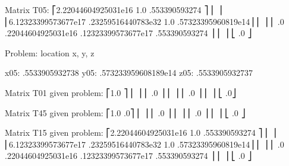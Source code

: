 \documentclass[letterpaper,10pt,english,openany,oneside]{sphinxmanual}
\begin{document}
\begin{sphinxVerbatim}[commandchars=\\\{\},numbers=left,firstnumber=1,stepnumber=1]
  Matrix T05:
  ⎡2.22044604925031e\PYGZhy{}16          \PYGZhy{}1.0                                 .553390593274  ⎤
  ⎢                                                                                      ⎥
  ⎢6.12323399573677e\PYGZhy{}17  .23259516440783e\PYGZhy{}32          \PYGZhy{}1.0          .57323395960819e\PYGZhy{}14⎥
  ⎢                                                                                      ⎥
  ⎢        .0           .22044604925031e\PYGZhy{}16  .12323399573677e\PYGZhy{}17    .553390593274  ⎥
  ⎢                                                                                      ⎥
  ⎣                                                                       .0         ⎦


  Problem: location x, y, z

  x05: .5533905932738
  y05: .573233959608189e\PYGZhy{}14
  z05: .5533905932737

  Matrix T01  given problem:
  ⎡1.0            ⎤
  ⎢                  ⎥
  ⎢    .0        ⎥
  ⎢                  ⎥
  ⎢        .0    ⎥
  ⎢                  ⎥
  ⎣            .0⎦

  Matrix T45  given problem:
  ⎡1.0          .0⎤
  ⎢                    ⎥
  ⎢    .0          ⎥
  ⎢                    ⎥
  ⎢        .0      ⎥
  ⎢                    ⎥
  ⎣             .0 ⎦

  Matrix T15  given problem:
  ⎡2.22044604925031e\PYGZhy{}16          \PYGZhy{}1.0                                 .553390593274  ⎤
  ⎢                                                                                      ⎥
  ⎢6.12323399573677e\PYGZhy{}17  .23259516440783e\PYGZhy{}32          \PYGZhy{}1.0          .57323395960819e\PYGZhy{}14⎥
  ⎢                                                                                      ⎥
  ⎢        .0           .22044604925031e\PYGZhy{}16  .12323399573677e\PYGZhy{}17    .553390593274  ⎥
  ⎢                                                                                      ⎥
  ⎣                                                                       .0         ⎦


\end{sphinxVerbatim}
\end{document}
